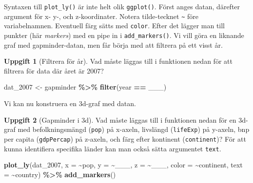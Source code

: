 \documentclass[
]{book}
\newenvironment{Shaded}{\begin{snugshade}}{\end{snugshade}}
\newcommand{\AttributeTok}[1]{\textcolor[rgb]{0.13,0.29,0.53}{#1}}
\newcommand{\FunctionTok}[1]{\textcolor[rgb]{0.13,0.29,0.53}{\textbf{#1}}}
\newcommand{\NormalTok}[1]{#1}
\newcommand{\OtherTok}[1]{\textcolor[rgb]{0.56,0.35,0.01}{#1}}
\newcommand{\SpecialCharTok}[1]{\textcolor[rgb]{0.81,0.36,0.00}{\textbf{#1}}}
\theoremstyle{definition}
\theoremstyle{definition}
\theoremstyle{definition}
\newtheorem{exercise}{Uppgift}[chapter]
\theoremstyle{definition}
\theoremstyle{remark}
\begin{document}
Syntaxen till \texttt{plot\_ly()} är inte helt olik \texttt{ggplot()}. Först anges datan, därefter argument för x- y-, och z-koordinater. Notera tilde-tecknet \texttt{\textasciitilde{}} före variabelnamnen. Eventuell färg sätts med \texttt{color}. Efter det lägger man till punkter (här \emph{markers}) med en pipe in i \texttt{add\_markers()}. Vi vill göra en liknande graf med gapminder-datan, men får börja med att filtrera på ett visst år.

\begin{exercise}[Filtrera för år]

Vad måste läggas till i funktionen nedan för att filtrera för data där året är 2007?

\begin{Shaded}
\begin{Highlighting}[]
\NormalTok{dat\_2007 }\OtherTok{\textless{}{-}}\NormalTok{ gapminder }\SpecialCharTok{\%\textgreater{}\%} 
  \FunctionTok{filter}\NormalTok{(year }\SpecialCharTok{==}\NormalTok{ \_\_\_)}
\end{Highlighting}
\end{Shaded}

\end{exercise}

Vi kan nu konstruera en 3d-graf med datan.

\begin{exercise}[Gapminder i 3d]

Vad måste läggas till i funktionen nedan för en 3d-graf med befolkningsmängd (\texttt{pop}) på x-axeln, livslängd (\texttt{lifeExp}) på y-axeln, bnp per capita (\texttt{gdpPercap}) på z-axeln, och färg efter kontinent (\texttt{continent})? För att kunna identifiera specifika länder kan man också sätta argumentet \texttt{text}.

\begin{Shaded}
\begin{Highlighting}[]
\FunctionTok{plot\_ly}\NormalTok{(dat\_2007, }\AttributeTok{x =} \SpecialCharTok{\textasciitilde{}}\NormalTok{pop, }\AttributeTok{y =} \SpecialCharTok{\textasciitilde{}}\NormalTok{\_\_\_, }\AttributeTok{z =} \SpecialCharTok{\textasciitilde{}}\NormalTok{\_\_\_, }
        \AttributeTok{color =} \SpecialCharTok{\textasciitilde{}}\NormalTok{continent, }\AttributeTok{text =} \SpecialCharTok{\textasciitilde{}}\NormalTok{country) }\SpecialCharTok{\%\textgreater{}\%} 
  \FunctionTok{add\_markers}\NormalTok{()}
\end{Highlighting}
\end{Shaded}

\end{exercise}
\end{document}
